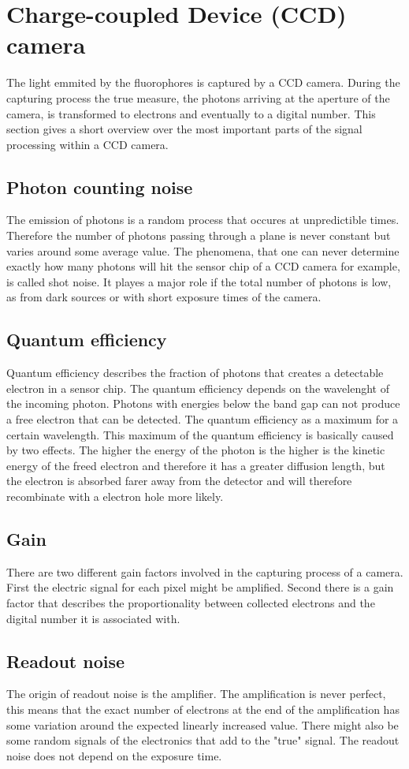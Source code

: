 \section{Charge-coupled Device (CCD) camera}
The light emmited by the fluorophores is captured by a CCD camera. During the capturing process the true measure, the photons arriving at the aperture of the camera, is transformed to electrons and eventually to a digital number. This section gives a short overview over the most important parts of the signal processing within a CCD camera.
\subsection{Photon counting noise}
The emission of photons is a random process that occures at unpredictible times. Therefore the number of photons passing through a plane is never constant but varies around some average value. The phenomena, that one can never determine exactly how many photons will hit the sensor chip of a CCD camera for example, is called shot noise. It playes a major role if the total number of photons is low, as from dark sources or with short exposure times of the camera.
\subsection{Quantum efficiency}
Quantum efficiency describes the fraction of photons that creates a detectable electron in a sensor chip. The quantum efficiency depends on the wavelenght of the incoming photon. Photons with energies below the band gap can not produce a free electron that can be detected. The quantum efficiency as a maximum for a certain wavelength. This maximum of the quantum efficiency is basically caused by two effects. The higher the energy of the photon is the higher is the kinetic energy of the freed electron and therefore it has a greater diffusion length, but the electron is absorbed farer away from the detector and will therefore recombinate with a electron hole more likely.
\subsection{Gain}
There are two different gain factors involved in the capturing process of a camera. First the electric signal for each pixel might be amplified. Second there is a gain factor that describes the proportionality between collected electrons and the digital number it is associated with.
\subsection{Readout noise}
The origin of readout noise is the amplifier. The amplification is never perfect, this means that the exact number of electrons at the end of the amplification has some variation around the expected linearly increased value. There might also be some random signals of the electronics that add to the "true" signal. The readout noise does not depend on the exposure time.
